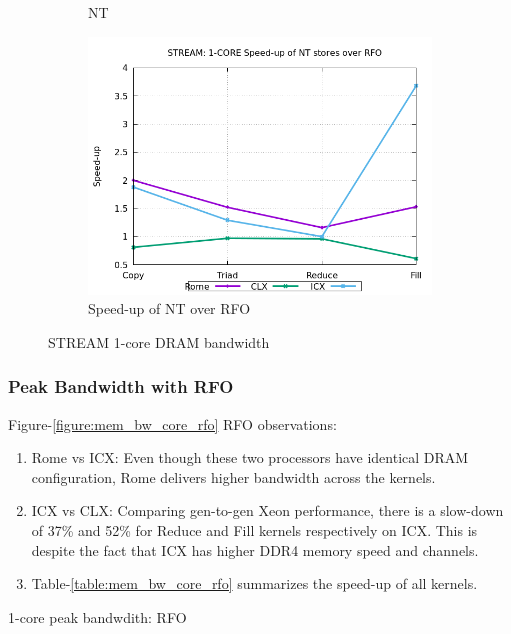 \documentclass{article}
\begin{document}
\begin{figure}[!hb]
\begin{subfigure}[!hb]{0.3\textwidth}
         \caption{NT}
         \label{figure:mem_bw_core_nt}
    \end{subfigure}
    \begin{subfigure}[!hb]{0.3\textwidth}
         \centering
         \includegraphics[width=\textwidth]{../mem_bw_core/mb_core_nt_rfo}
         \caption{Speed-up of NT over RFO}
         \label{figure:mem_bw_core_nt_rfo}
    \end{subfigure}

    \caption{STREAM 1-core DRAM bandwidth}
    \label{figure:mem_bw_core}
\end{figure}

\subsubsection{Peak Bandwidth with RFO}
Figure-\ref{figure:mem_bw_core_rfo} RFO observations:
\begin{enumerate}
\item Rome vs ICX: Even though these two processors have identical DRAM configuration, Rome delivers higher bandwidth across the kernels. 
\item ICX vs CLX: Comparing gen-to-gen Xeon performance, there is a slow-down of 37\% and 52\% for Reduce and Fill kernels respectively on ICX. This is despite the fact that ICX has higher DDR4 memory speed and channels.
\item Table-\ref{table:mem_bw_core_rfo} summarizes the speed-up of all kernels.
\end{enumerate}

\begin{table}[h!]
\centering

\caption{1-core peak bandwdith: RFO}
\label{table:mem_bw_core_rfo}
\end{table}
\end{document}
